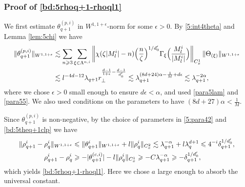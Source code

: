 \documentclass[10pt,a4paper]{amsart}
\numberwithin{equation}{section}
\def\({{\Big(}}
\def\){{\Big)}}
\newcommand{\norm}[1]{\left\|#1\right\|}
\def\geq{\geqslant}
\def\leq{\leqslant}
\def\({{\Big(}}
\def\){{\Big)}}
\def\geq{\geqslant}
\def\leq{\leqslant}
\begin{document}
\subsubsection{Proof of   \eqref{bd:5rhoq+1-rhoql1}} 
 We first estimate $\theta_{q+1}^{(p,i)}$ in $W^{1,1+\epsilon}$-norm for some $\epsilon>0$. By  \eqref{5:int4theta}  and  Lemma \ref{lem:5chi} we have
\begin{align}
\|\theta_{q+1}^{(p,i)}\|_{W^{1,1+\epsilon}}&\lesssim\sum_{n\geq3}\sum_{\xi\in\Lambda^{n,i}}\norm{\chi(\zeta |M^i_l|-n)\(\frac{n}{\zeta }\)^{1/d_0'}\Gamma_{\xi}\(\frac{M^i_l}{|M^i_l|}\)}_ {C_{x}^1}\|\Theta_{ (\xi)} \|_{W^{1,1+\epsilon}}\notag\\ 
&\lesssim l^{-4d-12}\lambda_{q+1}r_\perp^{\frac{d-1}{1+\epsilon}-\frac{d-1}{d_0'}}
\lesssim\lambda_{q+1}^{(8d+24)\alpha-\frac1M+d\epsilon}\lesssim  \lambda_{q+1}^{-2\alpha},\label{bd:5thetaq+1w11}
\end{align}
where we chose $\epsilon>0$ small enough to ensure $d\epsilon<\alpha$, and used \eqref{para5lam} and  \eqref{para55}. We also used  conditions on the parameters to have $(8d+27)\alpha<\frac1M$. 

Since $\theta_{q+1}^{(p,i)}$ is non-negative,  by the choice of parameters in \eqref{5:para42}  and \eqref{bd:5theq+1clp}  we have
\begin{align}\|\rho^{i}_{q+1}-\rho^{i}_q\|_{W^{1,1+\epsilon}} 
&\leq\|\theta^{i}_{q+1}\|_{W^{1,1+\epsilon}} +l\|\rho_q^i\|_{C_{x}^2} \lesssim  \lambda_{q+1}^{-\alpha}+l\lambda_q^{d+1}\leq 4^{-i}\delta_{q+1}^{1/d_0'},\notag\\
     \rho^i_{q+1} -   \rho^i_q&\geq-|\theta_{q+1}^{(c,i)}|-l\|  \rho^i_{q}\|_{ C_{x}^1} \geq -C\lambda_{q+1}^{-\alpha}\geq -\delta_{q+1}^{1/d_0'},\notag
\end{align}
which yields \eqref{bd:5rhoq+1-rhoql1}.  Here we chose $a$ large enough to absorb the universal constant. 
\end{document}

